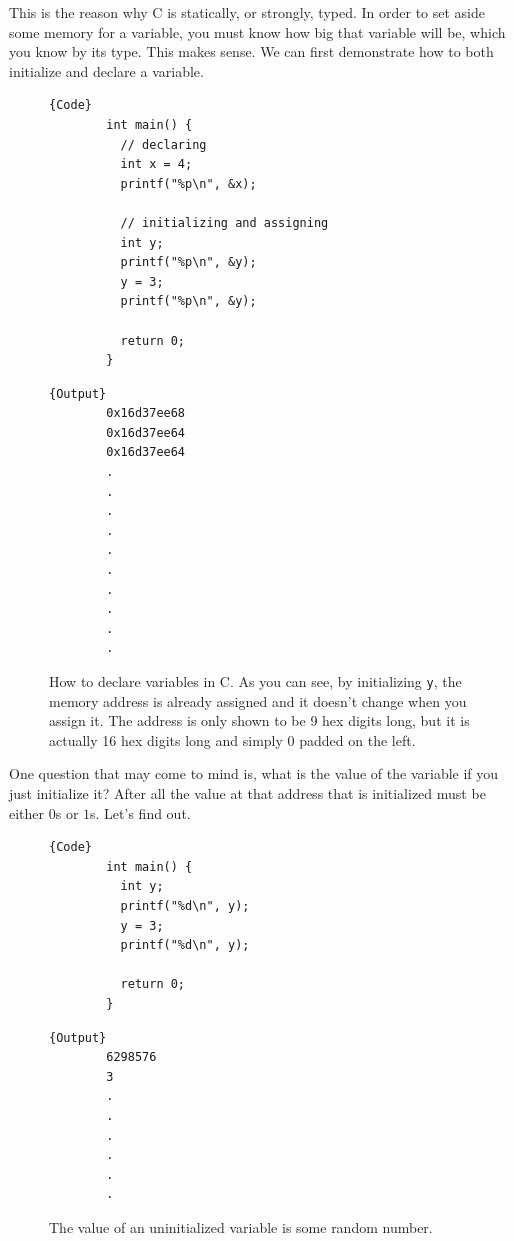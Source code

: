 \documentclass{article}
\begin{document}
    This is the reason why C is statically, or strongly, typed. In order to set aside some memory for a variable, you must know how big that variable will be, which you know by its type. This makes sense. We can first demonstrate how to both initialize and declare a variable. 

    \begin{figure}[H]
      \centering 
      \noindent\begin{minipage}{.5\textwidth}
      \begin{lstlisting}[]{Code}
        int main() {
          // declaring 
          int x = 4;   
          printf("%p\n", &x); 
          
          // initializing and assigning
          int y; 
          printf("%p\n", &y); 
          y = 3; 
          printf("%p\n", &y); 

          return 0; 
        }
      \end{lstlisting}
      \end{minipage}
      \hfill
      \begin{minipage}{.49\textwidth}
      \begin{lstlisting}[]{Output}
        0x16d37ee68
        0x16d37ee64
        0x16d37ee64 
        .
        .
        .
        .
        .
        .
        .
        .
        .
        .
      \end{lstlisting}
      \end{minipage}
      \caption{How to declare variables in C. As you can see, by initializing \texttt{y}, the memory address is already assigned and it doesn't change when you assign it. The address is only shown to be 9 hex digits long, but it is actually 16 hex digits long and simply 0 padded on the left. } 
      \label{fig:declaring_initializing_variables}
    \end{figure}

    One question that may come to mind is, what is the value of the variable if you just initialize it? After all the value at that address that is initialized must be either $0$s or $1$s. Let's find out. 

    \begin{figure}[H]
      \centering 
      \noindent\begin{minipage}{.5\textwidth}
      \begin{lstlisting}[]{Code}
        int main() { 
          int y; 
          printf("%d\n", y); 
          y = 3; 
          printf("%d\n", y); 

          return 0; 
        }
      \end{lstlisting}
      \end{minipage}
      \hfill
      \begin{minipage}{.49\textwidth}
      \begin{lstlisting}[]{Output}
        6298576 
        3
        .
        .
        .
        .
        .
        .
      \end{lstlisting}
      \end{minipage}
      \caption{The value of an uninitialized variable is some random number. } 
      \label{fig:uninitialized_variable}
    \end{figure}
\end{document}
